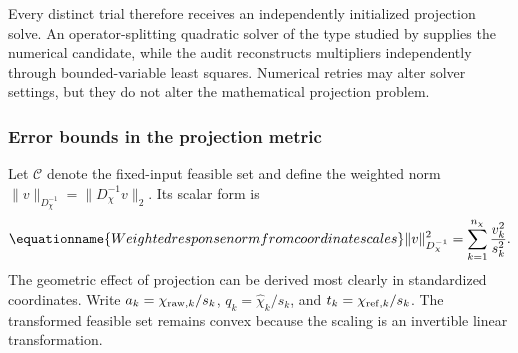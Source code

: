 Every distinct trial therefore receives an independently initialized projection solve. An operator-splitting quadratic solver of the type studied by \citet{Stellato2020} supplies the numerical candidate, while the audit reconstructs multipliers independently through bounded-variable least squares. Numerical retries may alter solver settings, but they do not alter the mathematical projection problem.

\subsubsection{Error bounds in the projection metric}

Let $\mathcal C$ denote the fixed-input feasible set and define the weighted norm
$\|v\|_{D_\chi^{-1}}=\|D_\chi^{-1}v\|_2$. Its scalar form is
\begin{equation}
\equationname{Weighted response norm from coordinate scales}
\|v\|_{D_\chi^{-1}}^2=\sum_{k=1}^{n_\chi}\frac{v_k^2}{s_k^2}.
\end{equation}
The geometric effect of projection can be derived most clearly in standardized coordinates. Write $a_k=\chi_{{\rm raw},k}/s_k$, $q_k=\widehat\chi_k/s_k$, and $t_k=\chi_{{\rm ref},k}/s_k$. The transformed feasible set remains convex because the scaling is an invertible linear transformation.

